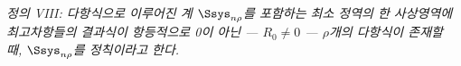 
\emph{정의 VIII: 다항식으로 이루어진 계 $\Ssys_{n\rho}$를 포함하는 최소 정역의 한 사상영역에 최고차항들의 결과식이 항등적으로 0이 아닌 --- $R_0\ne0$ --- $\rho$개의 다항식이 존재할 때, $\Ssys_{n\rho}$를 정칙이라고 한다.}
